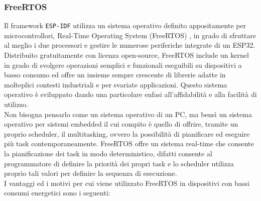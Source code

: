 \subsubsection{FreeRTOS}
Il framework \texttt{ESP-IDF} utilizza un sistema operativo definito appositamente per microcontrollori, Real-Time Operating System (FreeRTOS) \cite{barry2016mastering, FreeRTOS_site}, in grado di sfruttare al meglio i due processori e gestire le numerose periferiche integrate di un ESP32. Distribuito gratuitamente con licenza open-source, FreeRTOS include un kernel in grado di svolgere operazioni semplici e funzionali eseguibili su dispositivi a basso consumo ed offre un insieme sempre crescente di librerie adatte in molteplici contesti industriali e per svariate applicazioni. Questo sistema operativo è sviluppato dando una particolare enfasi all'affidabilità e alla facilità di utilizzo.\\
Non bisogna pensarlo come un sistema operativo di un PC, ma bensì un sistema operativo per sistemi embedded il cui compito è quello di offrire, tramite un proprio scheduler, il multitasking, ovvero la possibilità di pianificare ed eseguire più task contemporaneamente.
FreeRTOS offre un sistema real-time che consente la pianificazione dei task in modo deterministico, difatti consente al programmatore di definire la priorità dei propri task e lo scheduler utilizza proprio tali valori per definire la sequenza di esecuzione.\\
I vantaggi ed i motivi per cui viene utilizzato FreeRTOS in dispositivi con bassi consumi energetici sono i seguenti:
